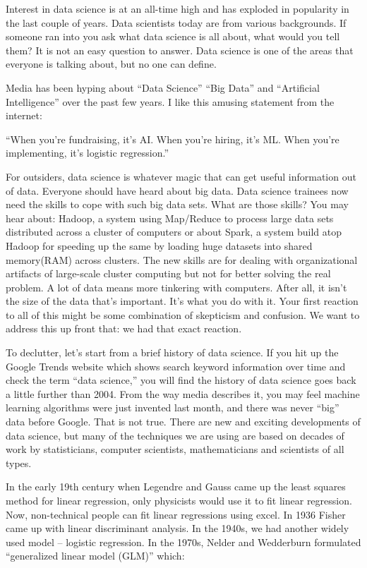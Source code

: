 \documentclass[12pt,]{krantz}
\renewenvironment{quote}{\begin{VF}}{\end{VF}}
\begin{document}
Interest in data science is at an all-time high and has exploded in popularity in the last couple of years. Data scientists today are from various backgrounds. If someone ran into you ask what data science is all about, what would you tell them? It is not an easy question to answer. Data science is one of the areas that everyone is talking about, but no one can define.

Media has been hyping about ``Data Science'' ``Big Data'' and ``Artificial Intelligence'' over the past few years. I like this amusing statement from the internet:

\begin{quote}
``When you're fundraising, it's AI. When you're hiring, it's ML. When you're implementing, it's logistic regression.''
\end{quote}

For outsiders, data science is whatever magic that can get useful information out of data. Everyone should have heard about big data. Data science trainees now need the skills to cope with such big data sets. What are those skills? You may hear about: Hadoop, a system using Map/Reduce to process large data sets distributed across a cluster of computers or about Spark, a system build atop Hadoop for speeding up the same by loading huge datasets into shared memory(RAM) across clusters. The new skills are for dealing with organizational artifacts of large-scale cluster computing but not for better solving the real problem. A lot of data means more tinkering with computers. After all, it isn't the size of the data that's important. It's what you do with it. Your first reaction to all of this might be some combination of skepticism and confusion. We want to address this up front that: we had that exact reaction.

To declutter, let's start from a brief history of data science. If you hit up the Google Trends website which shows search keyword information over time and check the term ``data science,'' you will find the history of data science goes back a little further than 2004. From the way media describes it, you may feel machine learning algorithms were just invented last month, and there was never ``big'' data before Google. That is not true. There are new and exciting developments of data science, but many of the techniques we are using are based on decades of work by statisticians, computer scientists, mathematicians and scientists of all types.

In the early 19th century when Legendre and Gauss came up the least squares method for linear regression, only physicists would use it to fit linear regression. Now, non-technical people can fit linear regressions using excel. In 1936 Fisher came up with linear discriminant analysis. In the 1940s, we had another widely used model -- logistic regression. In the 1970s, Nelder and Wedderburn formulated ``generalized linear model (GLM)'' which:
\end{document}
